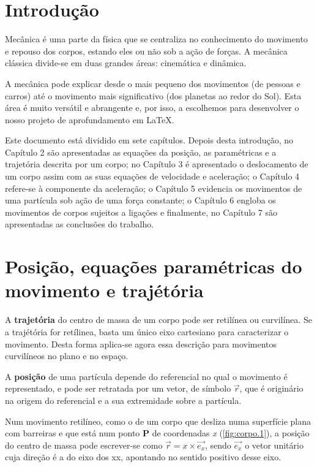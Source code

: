 \documentclass[a4paper,11pt,oneside]{report}
\begin{document}
\chapter{Introdução}
\label{chap.introducao}

Mecânica é uma parte da física que se centraliza no conhecimento do movimento 
e repouso dos corpos, estando eles ou não sob a ação de forças. A mecânica clássica 
divide-se em duas grandes áreas: cinemática e dinâmica.

A mecânica pode explicar desde o mais pequeno dos movimentos (de pessoas e carros) 
até o movimento mais significativo (dos planetas ao redor do Sol). Esta área é muito 
versátil e abrangente e, por isso, a escolhemos para desenvolver o nosso projeto de 
aprofundamento em \LaTeX.

Este documento está dividido em sete capítulos. Depois desta introdução, no Capítulo 
2 são apresentadas as equações da posição, as paramétricas e a trajetória descrita 
por um corpo; no Capítulo 3 é apresentado o deslocamento de um corpo assim com as 
suas equações de velocidade e aceleração; o Capítulo 4 refere-se à componente da 
aceleração; o Capítulo 5 evidencia os movimentos de uma partícula sob ação de uma 
força constante; o Capítulo 6 engloba os movimentos de corpos sujeitos a ligações 
e finalmente, no Capítulo 7 são apresentadas as conclusões do trabalho.


\chapter{Posição, equações paramétricas do movimento e trajétória}
\label{chap.posicao}

A \textbf{trajetória} do centro de massa de um corpo pode ser retilínea ou curvilínea.
Se a trajétória for retílinea, basta um único eixo cartesiano para caracterizar o movimento.
Desta forma aplica-se agora essa descrição para movimentos curvilíneos no plano e no espaço.

A \textbf{posição} de uma partícula  depende do referencial no qual o movimento é representado, e pode ser 
retratada por um vetor, de símbolo \(\vec{r}\), que é originário na origem do 
referencial e a sua extremidade sobre a partícula.

Num movimento retilíneo, como o de um corpo que desliza numa superfície plana com barreiras e que 
está num ponto \textbf{P} de coordenadas \textit{x} (\autoref{fig:corpo.1}), a posição do centro de massa pode escrever-se 
como \(\vec{r} = \textit{x} \times \vec{e_x}\), sendo \(\vec{e_x}\) o vetor unitário
cuja direção é a do eixo dos xx, apontando no sentido positivo desse eixo.
\end{document}
